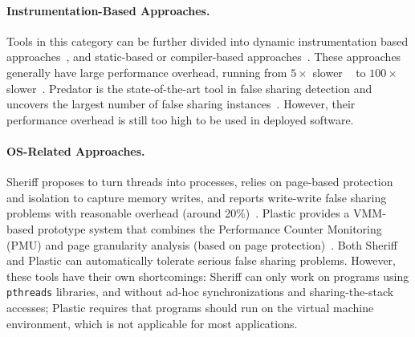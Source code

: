 \paragraph{Instrumentation-Based Approaches.} Tools in this category can be further divided into dynamic instrumentation based approaches~\cite{falseshare:binaryinstrumentation1, falseshare:binaryinstrumentation2, qinzhao}, and static-based or compiler-based approaches~\cite{Predator}.
These approaches generally have large performance overhead, running from $5\times$ slower ~\cite{qinzhao, Predator} to $100\times$ slower~\cite{falseshare:binaryinstrumentation1, falseshare:binaryinstrumentation2}. Predator is the state-of-the-art tool in false sharing detection and uncovers the largest number of false sharing instances~\cite{Predator}. However, their performance overhead is still too high to be used in deployed software. 


\paragraph{OS-Related Approaches.} Sheriff proposes to turn threads into processes, relies on page-based protection and isolation to capture memory writes, and reports write-write false sharing problems with reasonable overhead (around 20\%)~\cite{Sheriff}. Plastic provides a VMM-based prototype system that combines the Performance Counter Monitoring (PMU) and page granularity analysis (based on page protection)~\cite{OSdetection}. Both Sheriff and Plastic can automatically tolerate serious false sharing problems. However, these tools have their own shortcomings: Sheriff can only work on programs using \texttt{pthreads} libraries, and without ad-hoc synchronizations and sharing-the-stack accesses; Plastic requires that programs should run on the virtual machine environment, which is not applicable for most applications.   

